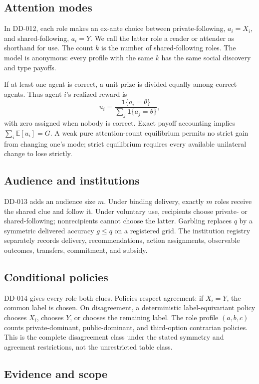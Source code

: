 \documentclass[11pt]{article}
\newcommand{\E}{\mathbb{E}}
\begin{document}
\subsection{Attention modes}

In DD-012, each role makes an ex-ante choice between private-following,
$a_i=X_i$, and shared-following, $a_i=Y$. We call the latter role a reader or
attender as shorthand for use. The count $k$ is the number of shared-following
roles. The model is anonymous: every profile with the same $k$ has the same
social discovery and type payoffs.

If at least one agent is correct, a unit prize is divided equally among correct
agents. Thus agent $i$'s realized reward is
\[
 u_i=\frac{\mathbf 1\{a_i=\theta\}}
 {\sum_j\mathbf 1\{a_j=\theta\}},
\]
with zero assigned when nobody is correct. Exact payoff accounting implies
$\sum_i\E[u_i]=G$. A weak pure attention-count equilibrium permits no strict
gain from changing one's mode; strict equilibrium requires every available
unilateral change to lose strictly.

\subsection{Audience and institutions}

DD-013 adds an audience size $m$. Under binding delivery, exactly $m$ roles
receive the shared clue and follow it. Under voluntary use, recipients choose
private- or shared-following; nonrecipients cannot choose the latter. Garbling
replaces $q$ by a symmetric delivered accuracy $g\leq q$ on a registered grid.
The institution registry separately records delivery, recommendations, action
assignments, observable outcomes, transfers, commitment, and subsidy.

\subsection{Conditional policies}

DD-014 gives every role both clues. Policies respect agreement: if $X_i=Y$,
the common label is chosen. On disagreement, a deterministic label-equivariant
policy chooses $X_i$, chooses $Y$, or chooses the remaining label. The role
profile $(a,b,c)$ counts private-dominant, public-dominant, and third-option
contrarian policies. This is the complete disagreement class under the stated
symmetry and agreement restrictions, not the unrestricted table class.

\subsection{Evidence and scope}
\end{document}
